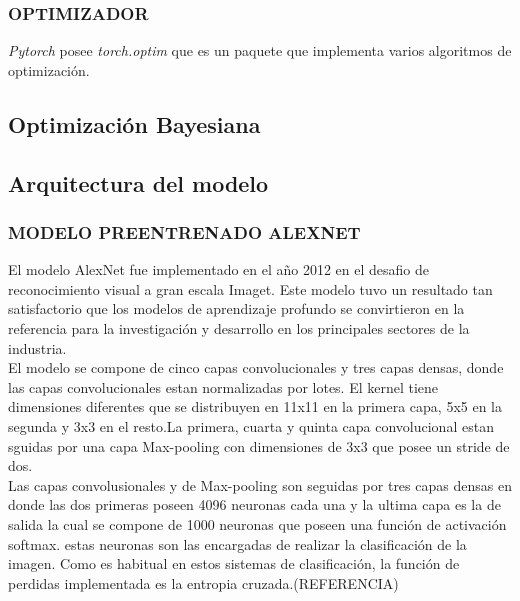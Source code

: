 			
			
			
			\newpage
			\subsubsection{OPTIMIZADOR}
			
			\textit{Pytorch} posee \textit{torch.optim} que es un paquete que implementa varios algoritmos de optimización. 
			
			
			
			
			

			
			
		\subsection{Optimización Bayesiana}	
			
			
		\subsection{Arquitectura del modelo}
			\subsubsection{\MakeUppercase{Modelo preentrenado ALEXNET}}
			
				El modelo AlexNet fue implementado en el año 2012 en el desafio de reconocimiento visual a gran escala Imaget. Este modelo tuvo un resultado tan satisfactorio que los modelos de aprendizaje profundo se convirtieron en la referencia para la investigación y desarrollo en los principales sectores de la industria. \cite{Pytorch}\\
				
				
				El modelo se compone de cinco capas convolucionales y tres capas densas, donde las capas 	convolucionales estan normalizadas por lotes. El kernel tiene dimensiones diferentes que se distribuyen en 11x11 en la primera capa, 5x5 en la segunda y 3x3 en el resto.La primera, cuarta y quinta capa convolucional estan sguidas por una capa Max-pooling con dimensiones de 3x3 que posee un stride de dos.\\
				
				
				Las capas convolusionales y de Max-pooling son seguidas por tres capas densas en donde las dos primeras poseen 4096 neuronas cada una y la ultima capa es la de salida la cual se compone de 1000 neuronas que poseen una función de activación softmax. estas neuronas son las encargadas de realizar la clasificación de la imagen. Como es habitual en estos sistemas de clasificación, la función de perdidas implementada es la entropia cruzada.(REFERENCIA)
				\\
				
